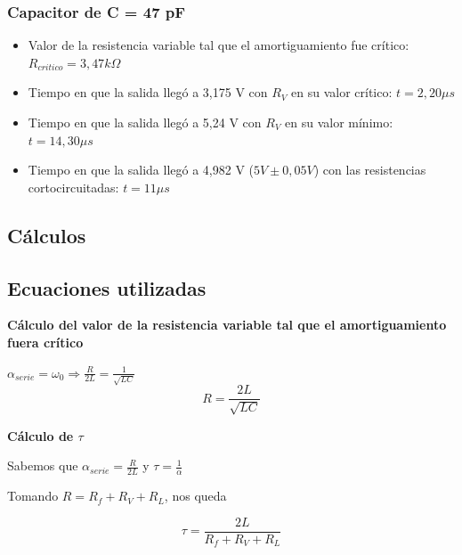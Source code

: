 \documentclass{article}
\begin{document}
        \subsubsection*{Capacitor de C = 47 pF}
            \begin{itemize}
                \item Valor de la resistencia variable tal que el amortiguamiento fue crítico: $ R_{critico} = 3,47 k\Omega $ %
                \item Tiempo en que la salida llegó a 3,175 V con $ R_V $ en su valor crítico: $ t = 2,20 \mu s$ %
                \item Tiempo en que la salida llegó a 5,24 V con $ R_V $ en su valor mínimo: $ t = 14,30 \mu s$ %
                \item Tiempo en que la salida llegó a 4,982 V ($ 5V \pm 0,05V $) con las resistencias cortocircuitadas: $ t = 11 \mu s$ %
            \end{itemize}

    \subsection{Cálculos}

        \subsection{Ecuaciones utilizadas}
            \textbf{Cálculo del valor de la resistencia variable tal que el amortiguamiento fuera crítico} \par \par
            $ \alpha_{serie} = \omega_0 \Rightarrow \frac{R}{2L} = \frac{1}{\sqrt{LC}} $
            \begin{equation}
                R = \frac{2L}{\sqrt{LC}}
            \end{equation}
            
            \par \par 

            \textbf{Cálculo de $ \tau $} \par \par
            Sabemos que $ \alpha_{serie} = \frac{R}{2L} $ y $ \tau = \frac{1}{\alpha} $  \par \par
            Tomando $ R = R_f + R_V + R_L $, nos queda \par \par
            \begin{equation}
                \tau = \frac{2L}{R_f + R_V + R_L} 
            \end{equation}
\end{document}
